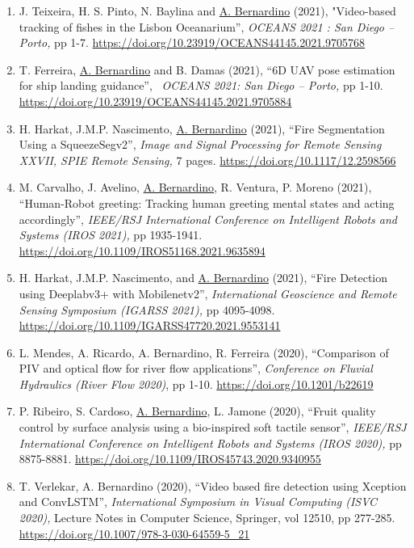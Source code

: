 \begin{enumerate}
  \emph{IEEE Intelligent Vehicles Symposium (IEEE IV 2021),} pp 797-803.
  \url{https://doi.org/10.1109/IV48863.2021.9576034}~
\item
  J. Teixeira, H. S. Pinto, N. Baylina and \ul{A. Bernardino} (2021),
  "Video-based tracking of fishes in the Lisbon Oceanarium'',
  \emph{OCEANS 2021 : San Diego -- Porto,} pp 1-7.
  \url{https://doi.org/10.23919/OCEANS44145.2021.9705768}~
\item
  T. Ferreira, \ul{A. Bernardino} and B. Damas (2021), ``6D UAV pose
  estimation for ship landing guidance'',~ \emph{OCEANS 2021: San Diego
  -- Porto,} pp 1-10.
  \url{https://doi.org/10.23919/OCEANS44145.2021.9705884}~
\item
  H. Harkat, J.M.P. Nascimento, \ul{A. Bernardino} (2021), ``Fire
  Segmentation Using a SqueezeSegv2'', \emph{Image and Signal Processing
  for Remote Sensing XXVII, SPIE Remote Sensing,} 7 pages.
  \url{https://doi.org/10.1117/12.2598566}~
\item
  M. Carvalho, J. Avelino, \ul{A. Bernardino}, R. Ventura, P. Moreno
  (2021), ``Human-Robot greeting: Tracking human greeting mental states
  and acting accordingly'', \emph{IEEE/RSJ International Conference on
  Intelligent Robots and Systems (IROS 2021),} pp 1935-1941.
  \url{https://doi.org/10.1109/IROS51168.2021.9635894}~
\item
  H. Harkat, J.M.P. Nascimento, and \ul{A. Bernardino} (2021), ``Fire
  Detection using Deeplabv3+ with Mobilenetv2'', \emph{International
  Geoscience and Remote Sensing Symposium (IGARSS 2021),} pp 4095-4098.
  \url{https://doi.org/10.1109/IGARSS47720.2021.9553141}~
\item
  L. Mendes, A. Ricardo, A. Bernardino, R. Ferreira (2020), ``Comparison
  of PIV and optical flow for river flow applications'',
  \emph{Conference on Fluvial Hydraulics (River Flow 2020)}, pp 1-10.
  \url{https://doi.org/10.1201/b22619}
\item
  P. Ribeiro, S. Cardoso, \ul{A. Bernardino}, L. Jamone (2020), ``Fruit
  quality control by surface analysis using a bio-inspired soft tactile
  sensor'', \emph{IEEE/RSJ International Conference on Intelligent
  Robots and Systems (IROS 2020),} pp 8875-8881.
  \url{https://doi.org/10.1109/IROS45743.2020.9340955}~~~
\item
  T. Verlekar, A. Bernardino (2020), ``Video based fire detection using
  Xception and ConvLSTM'', \emph{International Symposium in Visual
  Computing (ISVC 2020),} Lecture Notes in Computer Science, Springer,
  vol 12510, pp 277-285.
  \url{https://doi.org/10.1007/978-3-030-64559-5_21}~~

\end{enumerate}
